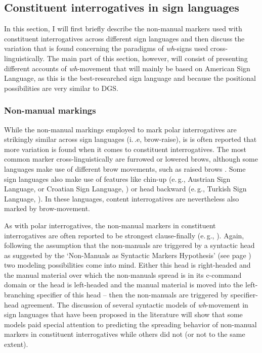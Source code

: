 \subsection{Constituent interrogatives in sign languages}\label{whsigned}
In this section, I will first briefly describe the non-manual markers used with constituent interrogatives across different sign languages and then discuss the variation that is found concerning the paradigms of \textit{wh}-signs used cross-linguistically. The main part of this section, however, will consist of presenting different accounts of \textit{wh}-movement that will mainly be based on American Sign Language, as this is the best-researched sign language and because the positional possibilities are very similar to  DGS. %


\subsubsection{Non-manual markings}
While the non-manual markings employed to mark polar interrogatives are strikingly similar across sign languages (i.\,.e, brow-raise), is is often reported that more variation is found when it comes to constituent interrogatives. The most common marker cross-linguistically are furrowed or lowered brows, although some languages make use of different brow movements, such as raised brows \citep{zeshan2004interrogative}. Some sign languages also make use of features like chin-up (e.\,g., Austrian Sign Language, \citealt{sarac2007cross} or Croatian Sign Language, \citealt{sarac2006interrogative}) or head backward (e.\,g., Turkish Sign Language, \citealt{goksel2013phonological}). In these languages, content interrogatives are nevertheless also marked by brow-movement.

As with polar interrogatives, the non-manual markers in constituent interrogatives are often reported to be strongest clause-finally (e.\,g., \citealt{sandler2006sign}). Again, following the assumption that the non-manuals are triggered by a syntactic head as suggested by the `Non-Manuals as Syntactic Markers Hypothesis' (see page \pageref{nmasmh}) two modeling possibilities come into mind. Either this head is right-headed and the manual material over which the non-manuals spread is in its c-command domain or the head is left-headed and the manual material is moved into the left-branching specifier of this head -- then the non-manuals are triggered by specifier-head agreement. The discussion of several syntactic models of \textit{wh}-movement in sign languages that have been proposed in the literature will show that some models paid special attention to predicting the spreading behavior of non-manual markers in constituent interrogatives while others did not (or not to the same extent).

